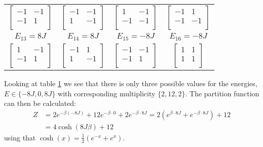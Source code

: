 \documentclass[11pt,a4wide]{article}
\begin{document}
\begin{table}
\begin{tabular}{cccc}
$
\left[ \begin{array}{cc} -1 & -1 \\
                             	    -1  & 1 \\
\end{array} \right]$ &
$
\left[ \begin{array}{cc} -1 & -1 \\
                             	    1  & -1 \\
\end{array} \right]$ &
$
\left[ \begin{array}{cc} 1 & -1 \\
                             	    -1  & -1 \\
\end{array} \right]$ &
$
\left[ \begin{array}{cc} -1 & 1 \\
                             	    -1  & -1 \\
\end{array} \right]$ \\
$E_{13} = 8J$ & $E_{14} = 8J$ & $E_{15} = -8J$& $E_{16} = -8J$ \\ 
$
\left[ \begin{array}{cc} 1 & -1 \\
                             	    -1  & 1 \\
\end{array} \right]$ &
$
\left[ \begin{array}{cc} -1 & 1 \\
                             	    1  & -1 \\
\end{array} \right]$ &
$
\left[ \begin{array}{cc} -1 & -1 \\
                             	    -1  & 1 \\
\end{array} \right]$ &
$
\left[ \begin{array}{cc} 1 & 1 \\
                             	    1  & 1 \\
\end{array} \right]$
\end{tabular}
\label{tab: energies}
\end{table}

Looking at table \ref{tab: energies} we see that there is only three possible values for the energies, $E \in \{-8J, 0, 8J\}$ with corresponding multiplicity $\{2, 12, 2\}$. The partition function can then be calculated:
\begin{align*}
Z &= 2e^{-\beta (-8J)} + 12e^{-\beta \cdot 0} + 2 e^{-\beta \cdot 8J} = 2(e^{\beta \cdot 8J}  + e^{-\beta \cdot 8J}) + 12 \\
&= 4\cosh(8J\beta) + 12
\end{align*}
using that $\cosh(x) = \frac{1}{2}(e^{-x} + e^x)$.
\end{document}
